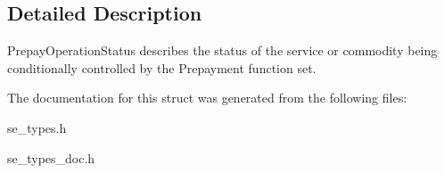 \subsection{Detailed Description}
Prepay\+Operation\+Status describes the status of the service or commodity being conditionally controlled by the Prepayment function set. 

The documentation for this struct was generated from the following files\+:\begin{DoxyCompactItemize}
\item 
se\+\_\+types.\+h\item 
se\+\_\+types\+\_\+doc.\+h\end{DoxyCompactItemize}

